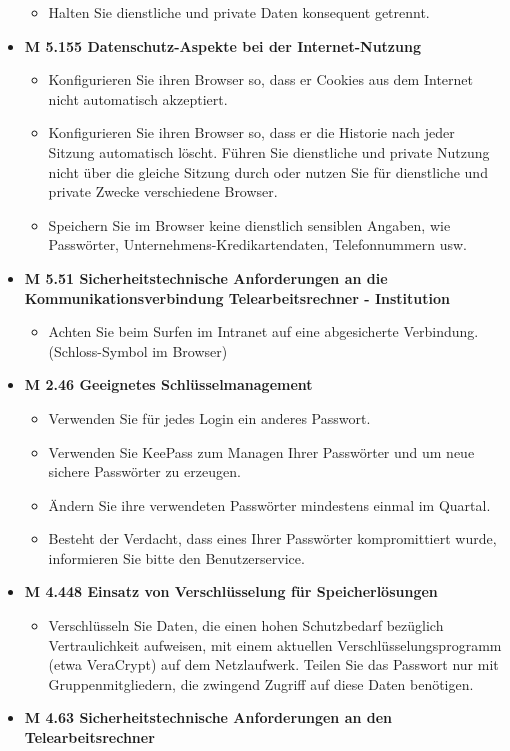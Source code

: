 \documentclass[]{article}
\begin{document}
\begin{itemize}
  \begin{itemize}
  \item
    Halten Sie dienstliche und private Daten konsequent getrennt.
  \end{itemize}
\item
  \textbf{M 5.155 Datenschutz-Aspekte bei der Internet-Nutzung}

  \begin{itemize}
  \item
    Konfigurieren Sie ihren Browser so, dass er Cookies aus dem Internet
    nicht automatisch akzeptiert.
  \item
    Konfigurieren Sie ihren Browser so, dass er die Historie nach jeder
    Sitzung automatisch löscht. Führen Sie dienstliche und private
    Nutzung nicht über die gleiche Sitzung durch oder nutzen Sie für
    dienstliche und private Zwecke verschiedene Browser.
  \item
    Speichern Sie im Browser keine dienstlich sensiblen Angaben, wie
    Passwörter, Unternehmens-Kredikartendaten, Telefonnummern usw.
  \end{itemize}
\item
  \textbf{M 5.51 Sicherheitstechnische Anforderungen an die
  Kommunikationsverbindung Telearbeitsrechner - Institution}

  \begin{itemize}
  \item
    Achten Sie beim Surfen im Intranet auf eine abgesicherte Verbindung.
    (Schloss-Symbol im Browser)
  \end{itemize}
\item
  \textbf{M 2.46 Geeignetes Schlüsselmanagement}

  \begin{itemize}
  \item
    Verwenden Sie für jedes Login ein anderes Passwort.
  \item
    Verwenden Sie KeePass zum Managen Ihrer Passwörter und um neue
    sichere Passwörter zu erzeugen.
  \item
    Ändern Sie ihre verwendeten Passwörter mindestens einmal im Quartal.
  \item
    Besteht der Verdacht, dass eines Ihrer Passwörter kompromittiert
    wurde, informieren Sie bitte den Benutzerservice.
  \end{itemize}
\item
  \textbf{M 4.448 Einsatz von Verschlüsselung für Speicherlösungen}

  \begin{itemize}
  \item
    Verschlüsseln Sie Daten, die einen hohen Schutzbedarf bezüglich
    Vertraulichkeit aufweisen, mit einem aktuellen
    Verschlüsselungsprogramm (etwa VeraCrypt) auf dem Netzlaufwerk.
    Teilen Sie das Passwort nur mit Gruppenmitgliedern, die zwingend
    Zugriff auf diese Daten benötigen.
  \end{itemize}
\item
  \textbf{M 4.63 Sicherheitstechnische Anforderungen an den
  Telearbeitsrechner}


\end{itemize}
\end{document}
